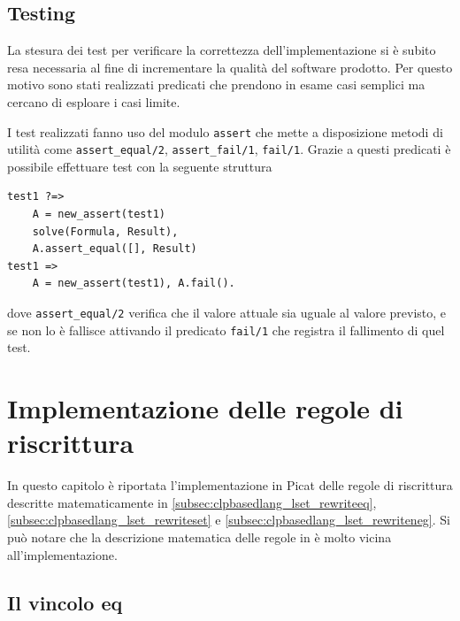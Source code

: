 \documentclass[12pt,a4paper,openright]{book} %
\begin{document}
\section{Testing}
\label{sec:lsetpicat_testing}

La stesura dei test per verificare la correttezza dell'implementazione
si è subito resa necessaria al fine di incrementare la qualità del
software prodotto. Per questo motivo sono stati realizzati predicati
che prendono in esame casi semplici ma cercano di esploare i casi
limite.

I test realizzati fanno uso del modulo \verb|assert| che mette a
disposizione metodi di utilità come \verb|assert_equal/2|,
\verb|assert_fail/1|, \verb|fail/1|. Grazie a questi predicati è
possibile effettuare test con la seguente struttura
\begin{verbatim}
test1 ?=>
    A = new_assert(test1)
    solve(Formula, Result),
    A.assert_equal([], Result)
test1 =>
    A = new_assert(test1), A.fail().
\end{verbatim}
dove \verb|assert_equal/2| verifica che il valore attuale sia uguale
al valore previsto, e se non lo è fallisce attivando il predicato
\verb|fail/1| che registra il fallimento di quel test.

\clearpage




\chapter{Implementazione delle regole di riscrittura}
\label{ch:impl}

\minitoc

In questo capitolo è riportata l'implementazione in Picat delle regole
di riscrittura descritte matematicamente in
\ref{subsec:clpbasedlang_lset_rewriteeq},
\ref{subsec:clpbasedlang_lset_rewriteset} e
\ref{subsec:clpbasedlang_lset_rewriteneg}. Si può notare che la
descrizione matematica delle regole in \cite{Rossi18} è molto vicina
all’implementazione.

\section{Il vincolo eq}
\end{document}
